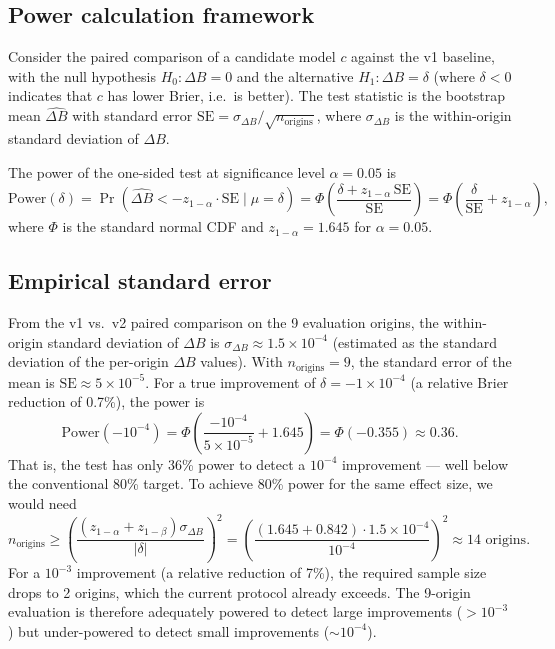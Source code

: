 \documentclass[10pt,a4paper,twocolumn]{article}
\begin{document}
\subsection{Power calculation framework}

Consider the paired comparison of a candidate model $c$ against the v1 baseline, with the null hypothesis $H_0: \Delta B = 0$ and the alternative $H_1: \Delta B = \delta$ (where $\delta < 0$ indicates that $c$ has lower Brier, i.e.\ is better). The test statistic is the bootstrap mean $\widehat{\Delta B}$ with standard error $\text{SE} = \sigma_{\Delta B} / \sqrt{n_{\text{origins}}}$, where $\sigma_{\Delta B}$ is the within-origin standard deviation of $\Delta B$.

The power of the one-sided test at significance level $\alpha = 0.05$ is
\[
\text{Power}(\delta) = \Pr\!\left( \widehat{\Delta B} < -z_{1-\alpha} \cdot \text{SE} \mid \mu = \delta \right) = \Phi\!\left( \frac{\delta + z_{1-\alpha}\,\text{SE}}{\text{SE}} \right) = \Phi\!\left( \frac{\delta}{\text{SE}} + z_{1-\alpha} \right),
\]
where $\Phi$ is the standard normal CDF and $z_{1-\alpha} = 1.645$ for $\alpha = 0.05$.

\subsection{Empirical standard error}

From the v1 vs.\ v2 paired comparison on the 9 evaluation origins, the within-origin standard deviation of $\Delta B$ is $\sigma_{\Delta B} \approx 1.5 \times 10^{-4}$ (estimated as the standard deviation of the per-origin $\Delta B$ values). With $n_{\text{origins}} = 9$, the standard error of the mean is $\text{SE} \approx 5 \times 10^{-5}$. For a true improvement of $\delta = -1 \times 10^{-4}$ (a relative Brier reduction of 0.7\%), the power is
\[
\text{Power}(-10^{-4}) = \Phi\!\left( \frac{-10^{-4}}{5 \times 10^{-5}} + 1.645 \right) = \Phi(-0.355) \approx 0.36.
\]
That is, the test has only 36\% power to detect a $10^{-4}$ improvement --- well below the conventional 80\% target. To achieve 80\% power for the same effect size, we would need
\[
n_{\text{origins}} \geq \left( \frac{(z_{1-\alpha} + z_{1-\beta}) \sigma_{\Delta B}}{|\delta|} \right)^2 = \left( \frac{(1.645 + 0.842) \cdot 1.5 \times 10^{-4}}{10^{-4}} \right)^2 \approx 14 \text{ origins}.
\]
For a $10^{-3}$ improvement (a relative reduction of 7\%), the required sample size drops to 2 origins, which the current protocol already exceeds. The 9-origin evaluation is therefore adequately powered to detect large improvements ($> 10^{-3}$) but under-powered to detect small improvements ($\sim 10^{-4}$).
\end{document}
